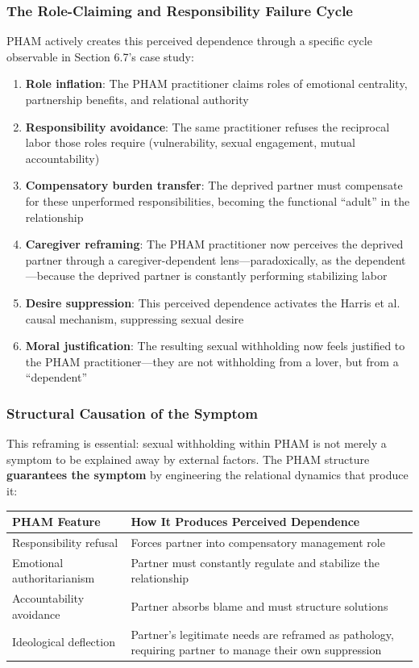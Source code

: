 \documentclass[12pt, letterpaper]{article}
\begin{document}
\subsubsection{The Role-Claiming and Responsibility Failure Cycle}

PHAM actively creates this perceived dependence through a specific cycle observable in Section 6.7's case study:

\begin{enumerate}
    \item \textbf{Role inflation}: The PHAM practitioner claims roles of emotional centrality, partnership benefits, and relational authority
    \item \textbf{Responsibility avoidance}: The same practitioner refuses the reciprocal labor those roles require (vulnerability, sexual engagement, mutual accountability)
    \item \textbf{Compensatory burden transfer}: The deprived partner must compensate for these unperformed responsibilities, becoming the functional ``adult'' in the relationship
    \item \textbf{Caregiver reframing}: The PHAM practitioner now perceives the deprived partner through a caregiver-dependent lens---paradoxically, as the dependent---because the deprived partner is constantly performing stabilizing labor
    \item \textbf{Desire suppression}: This perceived dependence activates the Harris et al. causal mechanism, suppressing sexual desire
    \item \textbf{Moral justification}: The resulting sexual withholding now feels justified to the PHAM practitioner---they are not withholding from a lover, but from a ``dependent''
\end{enumerate}

\subsubsection{Structural Causation of the Symptom}

This reframing is essential: sexual withholding within PHAM is not merely a symptom to be explained away by external factors. The PHAM structure \textbf{guarantees the symptom} by engineering the relational dynamics that produce it:

\begin{center}
\begin{tabular}{|p{2.2in}|p{3in}|}
\hline
\textbf{PHAM Feature} & \textbf{How It Produces Perceived Dependence} \\
\hline
Responsibility refusal & Forces partner into compensatory management role \\
\hline
Emotional authoritarianism & Partner must constantly regulate and stabilize the relationship \\
\hline
Accountability avoidance & Partner absorbs blame and must structure solutions \\
\hline
Ideological deflection & Partner's legitimate needs are reframed as pathology, requiring partner to manage their own suppression \\
\hline
\end{tabular}
\end{center}
\end{document}
